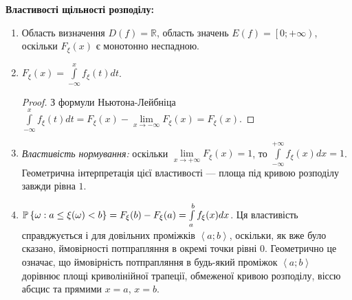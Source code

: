 \vspace{0.5em}
\noindent \textbf{Властивості щільності розподілу:}
\begin{enumerate}
    \item Область визначення $D(f) = \mathbb{R}$, область значень $E(f) = \left[0; +\infty\right)$, оскільки $F_\xi(x)$ є монотонно неспадною.
    \item $F_\xi(x)=\int\limits_{-\infty}^x f_\xi(t)dt$.
    \begin{proof}
        З формули Ньютона-Лейбніца $\int\limits_{-\infty}^x f_\xi(t)dt = F_\xi(x) - \underset{x\to-\infty}{\lim}F_\xi(x) = F_\xi(x)$.
    \end{proof}
    \item \emph{Властивість нормування:} оскільки $\lim\limits_{x \to +\infty} F_\xi(x) = 1$, то $\int\limits_{-\infty}^{+\infty} f_\xi(x)dx = 1$.
    Геометрична інтерпретація цієї властивості --- площа під кривою розподілу завжди рівна $1$.
    \item $\P\left\{\omega: a \leq \xi(\omega) < b\right\} = F_\xi(b) - F_\xi(a) = \int\limits_a^b f_\xi(x)dx$.
    Ця властивість справджується і для довільних проміжків $\left< a; b\right>$,
    оскільки, як вже було сказано, ймовірності потпрапляння в окремі точки рівні 0. Геометрично це означає,
    що ймовірність потпрапляння в будь-який проміжок $\left< a; b\right>$ дорівнює площі криволінійної трапеції,
    обмеженої кривою розподілу, віссю абсцис та прямими $x=a$, $x=b$.
\end{enumerate}

